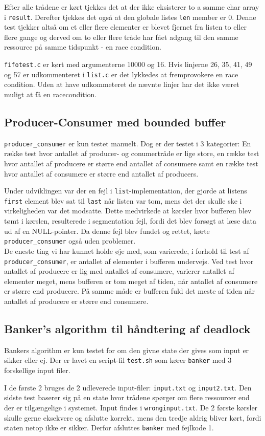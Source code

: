 Efter alle trådene er kørt tjekkes det at der ikke eksisterer to a samme char array i \texttt{result}. Derefter tjekkes det også at den globale listes \texttt{len} member er 0. Denne test tjekker altså om et eller flere elementer er blevet fjernet fra listen to eller flere gange og derved om to eller flere tråde har fået adgang til den samme ressource på samme tidspunkt - en race condition.

\texttt{fifotest.c} er kørt med argumenterne 10000 og 16. Hvis linjerne 26, 35, 41, 49 og 57 er udkommenteret i \texttt{list.c} er det lykkedes at fremprovokere en race condition. Uden at have udkommeteret de nævnte linjer har det ikke været muligt at få en racecondition.

\subsection{Producer-Consumer med bounded buffer}
\texttt{producer\_consumer} er kun testet manuelt. Dog er der testet i 3 kategorier: En række test hvor antallet af producer- og conumertråde er lige store, en række test hvor antallet af producere er større end antallet af consumere samt en række test hvor antallet af consumere er større end antallet af producers.

Under udviklingen var der en fejl i \texttt{list}-implementation, der gjorde at listens \texttt{first} element blev sat til \texttt{last} når listen var tom, mens det der skulle ske i virkeligheden var det modsatte. Dette medvirkede at kørsler hvor bufferen blev tømt i kørslen, resulterede i segmentation fejl, fordi det blev forsøgt at læse data ud af en NULL-pointer. Da denne fejl blev fundet og rettet, kørte \texttt{producer\_consumer} også uden problemer.\\

De eneste ting vi har kunnet holde øje med, som varierede, i forhold til test af \texttt{producer\_consumer}, er antallet af elementer i bufferen undervejs. Ved test hvor antallet af producere er lig med antallet af consumere, varierer antallet af elementer meget, mens bufferen er tom meget af tiden, når antallet af consumere er større end producere. På samme måde er bufferen fuld det meste af tiden når antallet af producere er større end consumere.

\subsection{Banker's algorithm til håndtering af deadlock}
Bankers algorithm er kun testet for om den givne state der gives som input er sikker eller ej. Der er lavet en script-fil \texttt{test.sh} som kører \texttt{banker} med 3 forskellige input filer.

I de første 2 bruges de 2 udleverede input-filer: \texttt{input.txt} og \texttt{input2.txt}. Den sidste test baserer sig på en state hvor trådene spørger om flere ressourcer end der er tilgængelige i systemet. Input findes i \texttt{wronginput.txt}. De 2 første kørsler skulle gerne eksekvere og afslutte korrekt, mens den tredje aldrig bliver kørt, fordi staten netop ikke er sikker. Derfor afsluttes \texttt{banker} med fejlkode 1.
